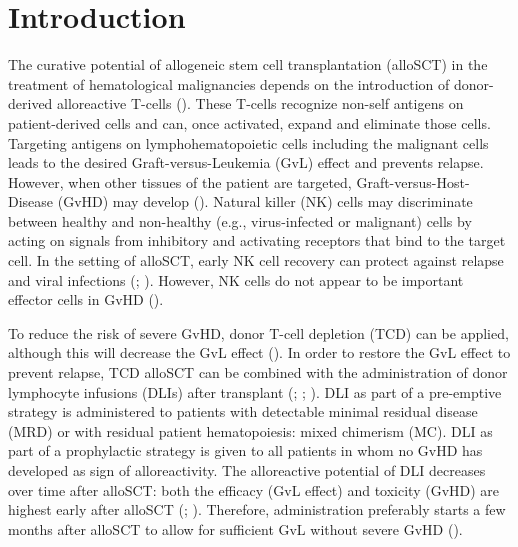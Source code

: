 \documentclass[
  letterpaper,
  DIV=11,
  numbers=noendperiod]{scrreprt}
\begin{document}
\hfill\break

\section{Introduction}\label{introduction-4}

The curative potential of allogeneic stem cell transplantation (alloSCT)
in the treatment of hematological malignancies depends on the
introduction of donor-derived alloreactive T-cells
(). These T-cells recognize non-self antigens on
patient-derived cells and can, once activated, expand and eliminate
those cells. Targeting antigens on lymphohematopoietic cells including
the malignant cells leads to the desired Graft-versus-Leukemia (GvL)
effect and prevents relapse. However, when other tissues of the patient
are targeted, Graft-versus-Host-Disease (GvHD) may develop
(). Natural killer (NK) cells may discriminate between healthy and
non-healthy (e.g., virus-infected or malignant) cells by acting on
signals from inhibitory and activating receptors that bind to the target
cell. In the setting of alloSCT, early NK cell recovery can protect
against relapse and viral infections
(; ). However, NK cells do not appear to be important
effector cells in GvHD
().

To reduce the risk of severe GvHD, donor T-cell depletion (TCD) can be
applied, although this will decrease the GvL effect
(). In
order to restore the GvL effect to prevent relapse, TCD alloSCT can be
combined with the administration of donor lymphocyte infusions (DLIs)
after transplant
(;
; ). DLI as part of a pre-emptive strategy is
administered to patients with detectable minimal residual disease (MRD)
or with residual patient hematopoiesis: mixed chimerism (MC). DLI as
part of a prophylactic strategy is given to all patients in whom no GvHD
has developed as sign of alloreactivity. The alloreactive potential of
DLI decreases over time after alloSCT: both the efficacy (GvL effect)
and toxicity (GvHD) are highest early after alloSCT
(; ). Therefore, administration preferably starts a few months
after alloSCT to allow for sufficient GvL without severe GvHD
().
\end{document}
